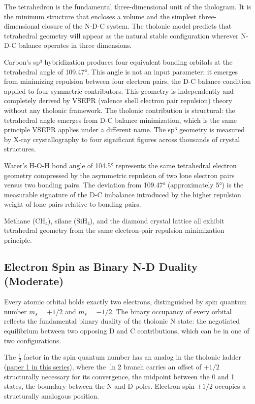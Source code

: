 \documentclass[12pt]{article}
\begin{document}
The tetrahedron is the fundamental three-dimensional unit of the
thologram. It is the minimum structure that encloses a volume and the
simplest three-dimensional closure of the N-D-C system. The tholonic
model predicts that tetrahedral geometry will appear as the natural
stable configuration wherever N-D-C balance operates in three
dimensions.

Carbon's sp³ hybridization produces four equivalent bonding orbitals at
the tetrahedral angle of 109.47°. This angle is not an input parameter;
it emerges from minimizing repulsion between four electron pairs, the
D-C balance condition applied to four symmetric contributors. This
geometry is independently and completely derived by VSEPR (valence shell
electron pair repulsion) theory without any tholonic framework. The
tholonic contribution is structural: the tetrahedral angle emerges from
D-C balance minimization, which is the same principle VSEPR applies
under a different name. The sp³ geometry is measured by X-ray
crystallography to four significant figures across thousands of crystal
structures.

Water's H-O-H bond angle of 104.5° represents the same tetrahedral
electron geometry compressed by the asymmetric repulsion of two lone
electron pairs versus two bonding pairs. The deviation from 109.47°
(approximately 5°) is the measurable signature of the D-C imbalance
introduced by the higher repulsion weight of lone pairs relative to
bonding pairs.

Methane (CH₄), silane (SiH₄), and the diamond crystal lattice all
exhibit tetrahedral geometry from the same electron-pair repulsion
minimization principle.

\subsection{Electron Spin as Binary N-D Duality (Moderate)}\label{electron-spin-as-binary-n-d-duality-moderate}

Every atomic orbital holds exactly two electrons, distinguished by spin
quantum number \(m_s = +1/2\) and \(m_s = -1/2\). The binary occupancy
of every orbital reflects the fundamental binary duality of the tholonic
N state: the negotiated equilibrium between two opposing D and C
contributions, which can be in one of two configurations.

The \(\tfrac{1}{2}\) factor in the spin quantum number has an analog in
the tholonic ladder
(\href{https://github.com/baardev/truevalue/blob/main/docnav/Research/papers/1_recursive-tholonic-five-constants/1_recursive-tholonic-five-constants.pdf}{paper
1 in this series}), where the \(\ln 2\) branch carries an offset of
\(+1/2\) structurally necessary for its convergence, the midpoint
between the 0 and 1 states, the boundary between the N and D poles.
Electron spin \(\pm 1/2\) occupies a structurally analogous position.
\end{document}
